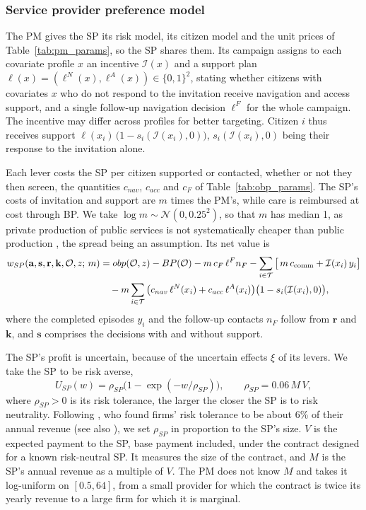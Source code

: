 \documentclass[12pt]{article}
\begin{document}
\subsubsection{Service provider preference model}\label{sec:obp_sp}
The PM gives the SP its risk model, its citizen model and the unit prices of Table~\ref{tab:pm_params}, so the SP shares them. Its campaign assigns to each covariate profile $x$ an incentive $\mathcal{I}(x)$ and a support plan $\ell(x) = (\ell^{N}(x), \ell^{A}(x)) \in \{0,1\}^2$, stating whether citizens with covariates $x$ who do not respond to the invitation receive navigation and access support, and a single follow-up navigation decision $\ell^F$ for the whole campaign. The incentive may differ across profiles for better targeting. Citizen $i$ thus receives support $\ell(x_i)\,\big(1 - s_i(\mathcal{I}(x_i), 0)\big)$, $s_i(\mathcal{I}(x_i), 0)$ being their response to the invitation alone.

Each lever costs the SP per citizen supported or contacted, whether or not they then screen, the quantities $c_{nav}$, $c_{acc}$ and $c_F$ of Table~\ref{tab:obp_params}. The SP's costs of invitation and support are $m$ times the PM's, while care is reimbursed at cost through BP. We take $\log m \sim \mathcal{N}(0, 0.25^2)$, so that $m$ has median 1, as private production of public services is not systematically cheaper than public production \citep{bel2010private}, the spread being an assumption. Its net value is
\begin{align}\label{eq:wsp}
  w_{SP}(\mathbf{a}, \mathbf{s}, \mathbf{r}, \mathbf{k}, \mathcal{O}, z;\, m)
  &= obp(\mathcal{O}, z) - BP(\mathcal{O}) - m\, c_F\, \ell^F n_F
     - \sum_{i \in \mathcal{T}} \big[\, m\, c_{\text{comm}} + \mathcal{I}(x_i)\, y_i \big] \\
  &\quad - m \sum_{i \in \mathcal{T}}
    \big(c_{nav}\, \ell^{N}(x_i) + c_{acc}\, \ell^{A}(x_i)\big)\big(1 - s_i(\mathcal{I}(x_i), 0)\big), \notag
\end{align}
where the completed episodes $y_i$ and the follow-up contacts $n_F$ follow from $\mathbf{r}$ and $\mathbf{k}$, and $\mathbf{s}$ comprises the decisions with and without support.

The SP's profit is uncertain, because of the uncertain effects $\xi$ of its levers. We take the SP to be risk averse,
\begin{equation}\label{eq:usp}
U_{SP}(w) = \rho_{SP}\big(1 - \exp(-w / \rho_{SP})\big), \qquad \rho_{SP} = 0.06\, M\, V,
\end{equation}
where $\rho_{SP} > 0$ is its risk tolerance, the larger the closer the SP is to risk neutrality. Following \citet{howard1988}, who found firms' risk tolerance to be about 6\% of their annual revenue (see also \citealp{smith2004risk}), we set $\rho_{SP}$ in proportion to the SP's size. $V$ is the expected payment to the SP, base payment included, under the contract designed for a known risk-neutral SP. It measures the size of the contract, and $M$ is the SP's annual revenue as a multiple of $V$. The PM does not know $M$ and takes it log-uniform on $[0.5, 64]$, from a small provider for which the contract is twice its yearly revenue to a large firm for which it is marginal.
\end{document}

